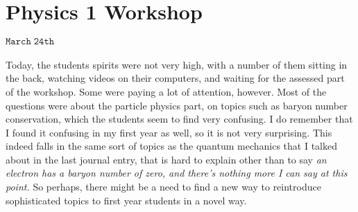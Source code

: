 \section{Physics 1 Workshop}
\begin{flushright}
$\mathtt{March \; 24th}$
\end{flushright}
\paragraph{}
Today, the students spirits were not very high, with a number of them sitting in the back, watching videos on their computers, and waiting for the assessed part of the workshop. Some were paying a lot of attention, however. Most of the questions were about the particle physics part, on topics such as baryon number conservation, which the students seem to find very confusing. I do remember that I found it confusing in my first year as well, so it is not very surprising. This indeed falls in the same sort of topics as the quantum mechanics that I talked about in the last journal entry, that is hard to explain other than to say \emph{an electron has a baryon number of zero, and there's nothing more I can say at this point.} So perhaps, there might be a need to find a new way to reintroduce sophisticated topics to first year students in a novel way. 